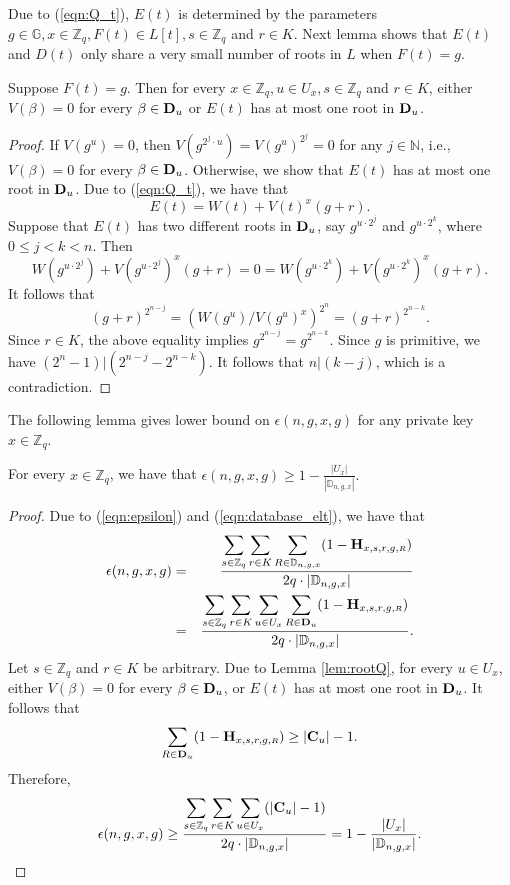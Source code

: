 \documentclass[JMC]{degruyter-journal}
\begin{document}
Due to (\ref{eqn:Q_t}), $E(t)$ is  determined by the parameters
$g\in \mathbb{G},x\in\mathbb{Z}_q, F(t)\in L[t], s\in \mathbb{Z}_q$
and $r\in K$. Next lemma shows that $E(t)$ and $D(t)$ only share a
very
 small number of roots in $L$
when $F(t)=g$.
\begin{lemma}\label{lem:rootQ}
Suppose  $F(t)=g$. Then for every $x\in \mathbb{Z}_q, u\in U_x, s\in
\mathbb{Z}_q$ and $ r\in K$, either $V(\beta)=0$ for every $\beta\in
{\bf D}_u$ or $E(t)$ has at most one root in ${\bf D}_u$.
\end{lemma}
\begin{proof}
If $V(g^u)=0$, then $V(g^{2^j\cdot u})=V(g^u)^{2^j}=0$ for any
$j\in \mathbb{N}$, i.e.,
 $V(\beta)=0$ for every $\beta\in {\bf D}_u$. Otherwise, we show that $E(t)$ has at most one root in
 ${\bf D}_u$.
Due to  (\ref{eqn:Q_t}), we have that
$$E(t)=W(t)+V(t)^x(g+r).$$
 Suppose that $E(t)$ has two different roots in  ${\bf D}_u$, say $g^{u\cdot 2^j}$ and $g^{u\cdot 2^k} $, where
 $0\leq j<k <n$. Then
$$W(g^{u\cdot 2^j})+V(g^{u\cdot 2^j})^x(g+r)=0=W(g^{u\cdot 2^k})+V(g^{u\cdot 2^k})^x(g+r).$$
It follows that
$$(g+r)^{2^{n-j}}=(W(g^u)/V(g^u)^x)^{2^n}=(g+r)^{2^{n-k}}.$$
Since $r\in K$, the above equality implies
$g^{2^{n-j}}=g^{2^{n-k}}.$  Since
$g$ is primitive, we have $(2^n-1)|(2^{n-j}-2^{n-k})$. It follows that
 $n|(k-j)$, which is a
contradiction.
\end{proof}

The following lemma gives  lower bound on $\epsilon(n,g,x,g)$ for
any private key $x\in \mathbb{Z}_q$.

\begin{lemma}\label{lem:lower_bound_epsilon}
For every $x\in \mathbb{Z}_q$, we have that $\displaystyle
\epsilon(n,g,x,g)\geq 1-\frac{|U_x|}{|\mathbb{D}_{n,g,x}|}.$
\end{lemma}
\begin{proof}
Due to  (\ref{eqn:epsilon}) and
(\ref{eqn:database_elt}), we have that
\begin{eqnarray*}
\epsilon(n,g,x,g)&=&\frac{\displaystyle\sum_{s\in
\mathbb{Z}_q}\sum_{r\in K}\sum_{R \in \mathbb{D}_{n,g,x}} (1-{\bf
H}_{x,s,r,g,{\scriptscriptstyle  R}})}{2q\cdot |\mathbb{D}_{n,g,x}|}\\
&=&
\frac{\displaystyle\sum_{s\in \mathbb{Z}_q}\sum_{r\in K}\sum_{u\in
U_x}\sum_{R\in {\bf D}_u}
 (1-{\bf H}_{x,s,r,g,{\scriptscriptstyle  R}})}{2q\cdot |\mathbb{D}_{n,g,x}|}.
\end{eqnarray*}
Let $s\in \mathbb{Z}_q$ and $r\in K$ be arbitrary.  Due to Lemma
\ref{lem:rootQ}, for every $u\in U_x$, either $V(\beta)=0$ for every
$\beta\in {\bf D}_u$, or $E(t)$ has at most one root in ${\bf D}_u$.
It follows that
$$\sum_{R\in {\bf D}_u} (1-{\bf H}_{x,s,r,g,{\scriptscriptstyle  R}})\geq |{\bf C}_u|-1.$$
Therefore,
\begin{eqnarray*}
\epsilon(n,g,x,g)\geq \frac{\displaystyle\sum_{s\in
\mathbb{Z}_q}\sum_{r\in K}\sum_{u\in U_x}(|{\bf C}_u|-1)} {2q
\cdot |\mathbb{D}_{n,g,x}|}=
 1-\frac{|U_x|}{|\mathbb{D}_{n,g,x}|}.
\end{eqnarray*}
\end{proof}
\end{document}
